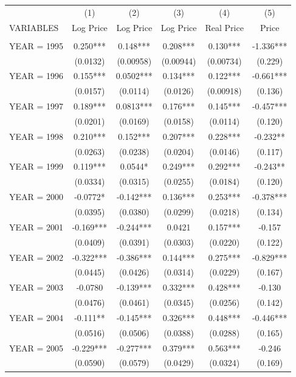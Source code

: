 \begin{tabular}{lccccc} \hline
 & (1) & (2) & (3) & (4) & (5) \\
VARIABLES & Log Price & Log Price & Log Price & Real Price & Price \\ \hline
 &  &  &  &  &  \\
YEAR = 1995 & 0.250*** & 0.148*** & 0.208*** & 0.130*** & -1.336*** \\
 & (0.0132) & (0.00958) & (0.00944) & (0.00734) & (0.229) \\
YEAR = 1996 & 0.155*** & 0.0502*** & 0.134*** & 0.122*** & -0.661*** \\
 & (0.0157) & (0.0114) & (0.0126) & (0.00918) & (0.136) \\
YEAR = 1997 & 0.189*** & 0.0813*** & 0.176*** & 0.145*** & -0.457*** \\
 & (0.0201) & (0.0169) & (0.0158) & (0.0114) & (0.120) \\
YEAR = 1998 & 0.210*** & 0.152*** & 0.207*** & 0.228*** & -0.232** \\
 & (0.0263) & (0.0238) & (0.0204) & (0.0146) & (0.117) \\
YEAR = 1999 & 0.119*** & 0.0544* & 0.249*** & 0.292*** & -0.243** \\
 & (0.0334) & (0.0315) & (0.0255) & (0.0184) & (0.120) \\
YEAR = 2000 & -0.0772* & -0.142*** & 0.136*** & 0.253*** & -0.378*** \\
 & (0.0395) & (0.0380) & (0.0299) & (0.0218) & (0.134) \\
YEAR = 2001 & -0.169*** & -0.244*** & 0.0421 & 0.157*** & -0.157 \\
 & (0.0409) & (0.0391) & (0.0303) & (0.0220) & (0.122) \\
YEAR = 2002 & -0.322*** & -0.386*** & 0.144*** & 0.275*** & -0.829*** \\
 & (0.0445) & (0.0426) & (0.0314) & (0.0229) & (0.167) \\
YEAR = 2003 & -0.0780 & -0.139*** & 0.332*** & 0.428*** & -0.130 \\
 & (0.0476) & (0.0461) & (0.0345) & (0.0256) & (0.142) \\
YEAR = 2004 & -0.111** & -0.145*** & 0.326*** & 0.448*** & -0.446*** \\
 & (0.0516) & (0.0506) & (0.0388) & (0.0288) & (0.165) \\
YEAR = 2005 & -0.229*** & -0.277*** & 0.379*** & 0.563*** & -0.246 \\
 & (0.0590) & (0.0579) & (0.0429) & (0.0324) & (0.169) \\

\end{tabular}

